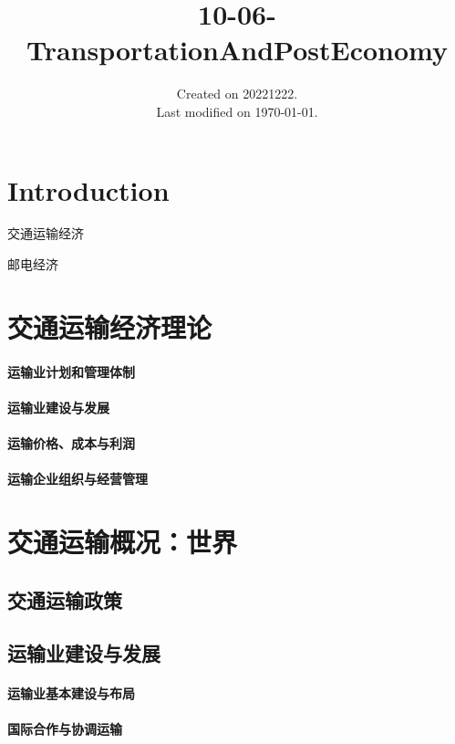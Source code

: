 \documentclass[UTF8]{../../RepresentationUniverse}
\begin{document}
\title{10-06-TransportationAndPostEconomy}
\date{Created on 20221222.\\   Last modified on \today.}
\maketitle
\tableofcontents


\chapter{Introduction}



交通运输经济


邮电经济
 

\chapter{交通运输经济理论}
    \subsubsection{运输业计划和管理体制}
    \subsubsection{运输业建设与发展}
    \subsubsection{运输价格、成本与利润}
    \subsubsection{运输企业组织与经营管理}

\chapter{交通运输概况：世界}
\section{交通运输政策}
\section{运输业建设与发展}
    \subsubsection{运输业基本建设与布局}
    \subsubsection{国际合作与协调运输}
\end{document}

